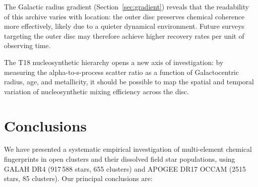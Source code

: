 \documentclass[fleqn,usenatbib]{mnras}
\begin{document}
The Galactic radius gradient (Section~\ref{sec:gradient}) reveals that the readability of this archive varies with location: the outer disc preserves chemical coherence more effectively, likely due to a quieter dynamical environment.
Future surveys targeting the outer disc may therefore achieve higher recovery rates per unit of observing time.

The T18 nucleosynthetic hierarchy opens a new axis of investigation: by measuring the alpha-to-s-process scatter ratio as a function of Galactocentric radius, age, and metallicity, it should be possible to map the spatial and temporal variation of nucleosynthetic mixing efficiency across the disc.


\section{Conclusions}
\label{sec:conclusions}

We have presented a systematic empirical investigation of multi-element chemical fingerprints in open clusters and their dissolved field star populations, using GALAH DR4 (917\,588 stars, 655 clusters) and APOGEE DR17 OCCAM (2515 stars, 85 clusters).
Our principal conclusions are:
\end{document}
